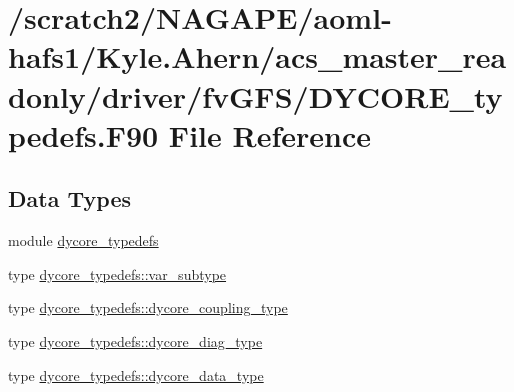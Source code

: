 \section{/scratch2/\-N\-A\-G\-A\-P\-E/aoml-\/hafs1/\-Kyle.Ahern/acs\-\_\-master\-\_\-readonly/driver/fv\-G\-F\-S/\-D\-Y\-C\-O\-R\-E\-\_\-typedefs.F90 File Reference}
\label{DYCORE__typedefs_8F90}
\subsection*{Data Types}
\begin{DoxyCompactItemize}
\item 
module \hyperlink{classdycore__typedefs}{dycore\-\_\-typedefs}
\item 
type \hyperlink{structdycore__typedefs_1_1var__subtype}{dycore\-\_\-typedefs\-::var\-\_\-subtype}
\item 
type \hyperlink{structdycore__typedefs_1_1dycore__coupling__type}{dycore\-\_\-typedefs\-::dycore\-\_\-coupling\-\_\-type}
\item 
type \hyperlink{structdycore__typedefs_1_1dycore__diag__type}{dycore\-\_\-typedefs\-::dycore\-\_\-diag\-\_\-type}
\item 
type \hyperlink{structdycore__typedefs_1_1dycore__data__type}{dycore\-\_\-typedefs\-::dycore\-\_\-data\-\_\-type}
\end{DoxyCompactItemize}
